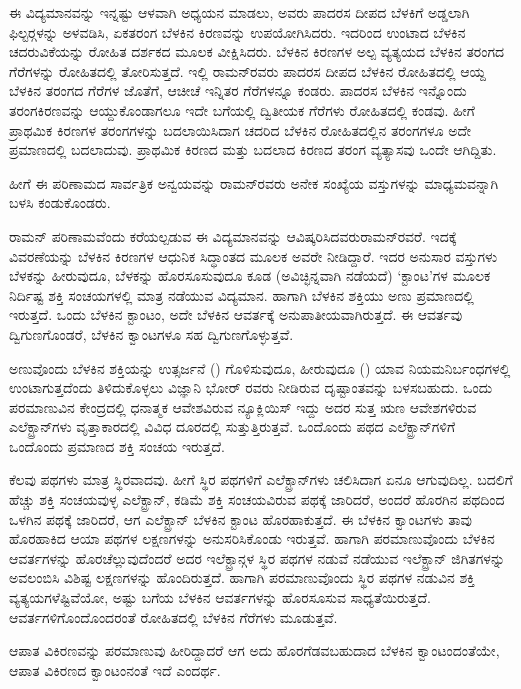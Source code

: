 ಈ ವಿದ್ಯಮಾನವನ್ನು ಇನ್ನಷ್ಟು ಆಳವಾಗಿ ಅಧ್ಯಯನ ಮಾಡಲು, ಅವರು ಪಾದರಸ ದೀಪದ ಬೆಳಕಿಗೆ ಅಡ್ಡಲಾಗಿ ಫಿಲ್ಟರ್‍ಗಳನ್ನು ಅಳವಡಿಸಿ, ಏಕತರಂಗ ಬೆಳಕಿನ ಕಿರಣವನ್ನು ಉಪಯೋಗಿಸಿದರು. ಇದರಿಂದ ಉಂಟಾದ ಬೆಳಕಿನ ಚದರುವಿಕೆಯನ್ನು ರೋಹಿತ ದರ್ಶಕದ ಮೂಲಕ ವೀಕ್ಷಿಸಿದರು. ಬೆಳಕಿನ ಕಿರಣಗಳ ಅಲ್ಪ ವ್ಯತ್ಯಯದ ಬೆಳಕಿನ ತರಂಗದ ಗೆರೆಗಳನ್ನು ರೋಹಿತದಲ್ಲಿ ತೋರಿಸುತ್ತದೆ. ಇಲ್ಲಿ ರಾಮನ್‍ರವರು ಪಾದರಸ ದೀಪದ ಬೆಳಕಿನ ರೋಹಿತದಲ್ಲಿ ಆಯ್ದ ಬೆಳಕಿನ ತರಂಗದ ಗೆರೆಗಳ ಜೊತೆಗೆ, ಆಚೀಚೆ ಇನ್ನಿತರ ಗೆರೆಗಳನ್ನೂ ಕಂಡರು. ಪಾದರಸ ಬೆಳಕಿನ ಇನ್ನೊಂದು ತರಂಗ\enginline{-}ಕಿರಣವನ್ನು ಆಯ್ದುಕೊಂಡಾಗಲೂ ಇದೇ ಬಗೆಯಲ್ಲಿ ದ್ವಿತೀಯಕ ಗೆರೆಗಳು ರೋಹಿತದಲ್ಲಿ ಕಂಡವು. ಹೀಗೆ ಪ್ರಾಥಮಿಕ ಕಿರಣಗಳ ತರಂಗಗಳನ್ನು ಬದಲಾಯಿಸಿದಾಗ ಚದರಿದ ಬೆಳಕಿನ ರೋಹಿತದಲ್ಲಿನ ತರಂಗಗಳೂ ಅದೇ ಪ್ರಮಾಣದಲ್ಲಿ ಬದಲಾದುವು. ಪ್ರಾಥಮಿಕ ಕಿರಣದ ಮತ್ತು ಬದಲಾದ ಕಿರಣದ ತರಂಗ ವ್ಯತ್ಯಾಸವು ಒಂದೇ ಆಗಿದ್ದಿತು.

ಹೀಗೆ ಈ ಪರಿಣಾಮದ ಸಾರ್ವತ್ರಿಕ ಅನ್ವಯವನ್ನು ರಾಮನ್‍ರವರು ಅನೇಕ ಸಂಖ್ಯೆಯ ವಸ್ತುಗಳನ್ನು ಮಾಧ್ಯಮವನ್ನಾಗಿ ಬಳಸಿ ಕಂಡುಕೊಂಡರು.

ರಾಮನ್ ಪರಿಣಾಮವೆಂದು ಕರೆಯಲ್ಪಡುವ ಈ ವಿದ್ಯಮಾನವನ್ನು ಆವಿಷ್ಕರಿಸಿದವರು\break ರಾಮನ್‍ರವರೆ. ಇದಕ್ಕೆ ವಿವರಣೆಯನ್ನು ಬೆಳಕಿನ ಕಿರಣಗಳ ಆಧುನಿಕ ಸಿದ್ಧಾಂತದ ಮೂಲಕ ಅವರೇ ನೀಡಿದ್ದಾರೆ. ಇದರ ಅನುಸಾರ ವಸ್ತುಗಳು ಬೆಳಕನ್ನು ಹೀರುವುದೂ, ಬೆಳಕನ್ನು ಹೊರಸೂಸುವುದೂ ಕೂಡ (ಅವಿಚ್ಛಿನ್ನವಾಗಿ ನಡೆಯದೆ) ‘ಕ್ಟಾಂಟ’ಗಳ ಮೂಲಕ ನಿರ್ದಿಷ್ಟ ಶಕ್ತಿ ಸಂಚಯಗಳಲ್ಲಿ ಮಾತ್ರ ನಡೆಯುವ ವಿದ್ಯಮಾನ. ಹಾಗಾಗಿ ಬೆಳಕಿನ ಶಕ್ತಿಯು ಅಣು ಪ್ರಮಾಣದಲ್ಲಿ ಇರುತ್ತದೆ. ಒಂದು ಬೆಳಕಿನ ಕ್ಟಾಂಟಂ, ಅದೇ ಬೆಳಕಿನ ಆವರ್ತಕ್ಕೆ ಅನುಪಾತೀಯವಾಗಿರುತ್ತದೆ. ಈ ಆವರ್ತವು ದ್ವಿಗುಣಗೊಂಡರೆ, ಬೆಳಕಿನ ಕ್ವಾಂಟಗಳೂ ಸಹ ದ್ವಿಗುಣಗೊಳ್ಳುತ್ತವೆ.

ಅಣುವೊಂದು ಬೆಳಕಿನ ಶಕ್ತಿಯನ್ನು ಉತ್ಸರ್ಜನೆ () ಗೊಳಿಸುವುದೂ, ಹೀರುವುದೂ () ಯಾವ ನಿಯಮ\enginline{-}ನಿರ್ಬಂಧಗಳಲ್ಲಿ ಉಂಟಾಗುತ್ತದೆಂದು ತಿಳಿದುಕೊಳ್ಳಲು ವಿಜ್ಞಾನಿ ಭೋರ್ ರವರು ನೀಡಿರುವ ದೃಷ್ಟಾಂತವನ್ನು ಬಳಸಬಹುದು. ಒಂದು ಪರಮಾಣುವಿನ ಕೇಂದ್ರದಲ್ಲಿ ಧನಾತ್ಮಕ ಆವೇಶವಿರುವ ನ್ಯೂಕ್ಲಿಯಿಸ್ ಇದ್ದು ಅದರ ಸುತ್ತ ಋಣ ಆವೇಶಗಳಿರುವ ಎಲೆಕ್ಟ್ರಾನ್‍ಗಳು ವೃತ್ತಾಕಾರದಲ್ಲಿ ವಿವಿಧ ದೂರದಲ್ಲಿ ಸುತ್ತುತ್ತಿರುತ್ತವೆ. ಒಂದೊಂದು ಪಥದ ಎಲೆಕ್ಟ್ರಾನ್‌ಗಳಿಗೆ ಒಂದೊಂದು ಪ್ರಮಾಣದ ಶಕ್ತಿ ಸಂಚಯ ಇರುತ್ತದೆ.

ಕೆಲವು ಪಥಗಳು ಮಾತ್ರ ಸ್ಥಿರವಾದವು. ಹೀಗೆ ಸ್ಥಿರ ಪಥಗಳಿಗೆ ಎಲೆಕ್ಟ್ರಾನ್‍ಗಳು ಚಲಿಸಿದಾಗ ಏನೂ ಆಗುವುದಿಲ್ಲ. ಬದಲಿಗೆ ಹೆಚ್ಚು ಶಕ್ತಿ ಸಂಚಯವುಳ್ಳ ಎಲೆಕ್ಟ್ರಾನ್, ಕಡಿಮೆ ಶಕ್ತಿ ಸಂಚಯವಿರುವ ಪಥಕ್ಕೆ ಜಾರಿದರೆ, ಅಂದರೆ ಹೊರಗಿನ ಪಥದಿಂದ ಒಳಗಿನ ಪಥಕ್ಕೆ ಜಾರಿದರೆ, ಆಗ ಎಲೆಕ್ಟ್ರಾನ್ ಬೆಳಕಿನ ಕ್ಟಾಂಟ ಹೊರಹಾಕುತ್ತದೆ. ಈ ಬೆಳಕಿನ ಕ್ವಾಂಟಗಳು ತಾವು ಹೊರಹಾಕಿದ ಆಯಾ ಪಥಗಳ ಲಕ್ಷಣಗಳನ್ನು ಅನುಸರಿಸಿಕೊಂಡು ಇರುತ್ತವೆ. ಹಾಗಾಗಿ ಪರಮಾಣುವೊಂದು ಬೆಳಕಿನ ಆವರ್ತಗಳನ್ನು ಹೊರಚೆಲ್ಲುವುದೆಂದರೆ ಅದರ ಇಲೆಕ್ಟ್ರಾನ್ಗಳ ಸ್ಥಿರ ಪಥಗಳ ನಡುವೆ ನಡೆಯುವ ಇಲೆಕ್ಟ್ರಾನ್ ಜಿಗಿತಗಳನ್ನು ಅವಲಂಬಿಸಿ ವಿಶಿಷ್ಟ ಲಕ್ಷಣಗಳನ್ನು ಹೊಂದಿರುತ್ತದೆ. ಹಾಗಾಗಿ ಪರಮಾಣುವೊಂದು ಸ್ಥಿರ ಪಥಗಳ ನಡುವಿನ ಶಕ್ತಿ ವ್ಯತ್ಯಯಗಳೆಷ್ಟಿವೆಯೋ, ಅಷ್ಟು ಬಗೆಯ ಬೆಳಕಿನ ಆವರ್ತಗಳನ್ನು ಹೊರಸೂಸುವ ಸಾಧ್ಯತೆಯಿರುತ್ತದೆ. ಆವರ್ತಗಳಿಗೊಂದೊಂದರಂತೆ ರೋಹಿತದಲ್ಲಿ ಬೆಳಕಿನ ಗೆರೆಗಳು ಮೂಡುತ್ತವೆ.

ಆಪಾತ ವಿಕಿರಣವನ್ನು ಪರಮಾಣುವು ಹೀರಿದ್ದಾದರೆ ಆಗ ಅದು ಹೊರಗೆಡವಬಹುದಾದ ಬೆಳಕಿನ ಕ್ವಾಂಟಂದಂತೆಯೇ, ಆಪಾತ ವಿಕಿರಣದ ಕ್ವಾಂಟಂನಂತೆ ಇದೆ ಎಂದರ್ಥ.

